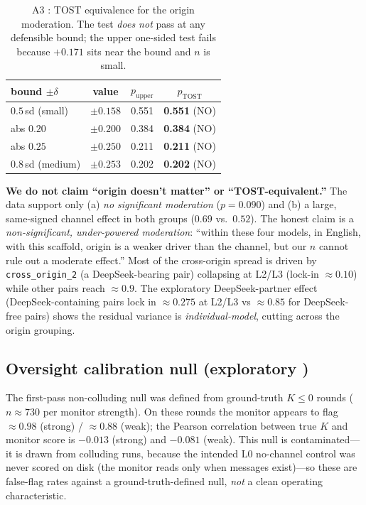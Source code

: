 \begin{table}[h]
\centering
\caption{A3 \tC{}: TOST equivalence for the origin moderation. The test \emph{does not} pass at
any defensible bound; the upper one-sided test fails because $+0.171$ sits near the bound and
$n$ is small.}
\label{tab:app-a3-tost}
\small
\begin{tabular}{lccc}
\toprule
bound $\pm\delta$ & value & $p_{\text{upper}}$ & $p_{\text{TOST}}$ \\
\midrule
$0.5\,$sd (small)  & $\pm0.158$ & 0.551 & \textbf{0.551} (NO) \\
abs $0.20$         & $\pm0.200$ & 0.384 & \textbf{0.384} (NO) \\
abs $0.25$         & $\pm0.250$ & 0.211 & \textbf{0.211} (NO) \\
$0.8\,$sd (medium) & $\pm0.253$ & 0.202 & \textbf{0.202} (NO) \\
\bottomrule
\end{tabular}
\end{table}

\noindent\textbf{We do not claim ``origin doesn't matter'' or ``TOST-equivalent.''} The data
support only (a) \emph{no significant moderation} ($p{=}0.090$) and (b) a large, same-signed
channel effect in both groups ($0.69$ vs.\ $0.52$). The honest claim is a \emph{non-significant,
under-powered moderation}: ``within these four models, in English, with this scaffold, origin is
a weaker driver than the channel, but our $n$ cannot rule out a moderate effect.'' Most of the
cross-origin spread is driven by \texttt{cross\_origin\_2} (a DeepSeek-bearing pair) collapsing
at L2/L3 (lock-in $\approx0.10$) while other pairs reach $\approx0.9$. The exploratory
DeepSeek-partner effect (DeepSeek-containing pairs lock in $\approx0.275$ at L2/L3 vs
$\approx0.85$ for DeepSeek-free pairs) shows the residual variance is \emph{individual-model},
cutting across the origin grouping.

\subsection{Oversight calibration null (exploratory \tE)}
\label{app:calib}

The first-pass non-colluding null was defined from ground-truth $K\le0$ rounds
($n\approx730$ per monitor strength). On these rounds the monitor appears to flag $\approx0.98$
(strong) / $\approx0.88$ (weak); the Pearson correlation between true $K$ and monitor score is
$-0.013$ (strong) and $-0.081$ (weak). This null is contaminated---it is drawn from colluding
runs, because the intended L0 no-channel control was never scored on disk (the monitor reads
only when messages exist)---so these are false-flag rates against a ground-truth-defined null,
\emph{not} a clean operating characteristic.

